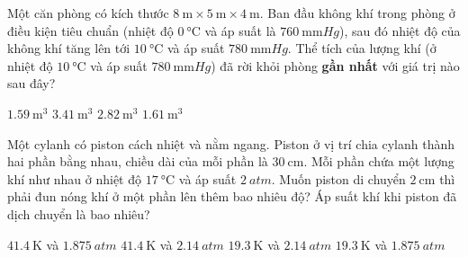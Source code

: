 \begin{ex}
Một căn phòng có kích thước $\SI{8}{\meter}\times \SI{5}{\meter}\times\SI{4}{\meter}$. Ban đầu không khí trong phòng ở điều kiện tiêu chuẩn (nhiệt độ $\SI{0}{\celsius}$ và áp suất là $\SI{760}{\milli\meter Hg}$), sau đó nhiệt độ của không khí tăng lên tới $\SI{10}{\celsius}$ và áp suất $\SI{780}{\milli\meter Hg}$. Thể tích của lượng khí (ở nhiệt độ $\SI{10}{\celsius}$ và áp suất $\SI{780}{\milli\meter Hg}$) đã rời khỏi phòng \textbf{gần nhất} với giá trị nào sau đây?
	
	\choice
	{$\SI{1.59}{\meter^3}$}
	{$\SI{3.41}{\meter^3}$}
	{$\SI{2.82}{\meter^3}$}
	{\True $\SI{1.61}{\meter^3}$}
\end{ex}
\begin{ex}
Một cylanh có piston cách nhiệt và nằm ngang. Piston ở vị trí chia cylanh thành hai phần bằng nhau, chiều dài của mỗi phần là $\SI{30}{\centi\meter}$. Mỗi phần chứa một lượng khí như nhau ở nhiệt độ $\SI{17}{\celsius}$ và áp suất $\SI{2}{atm}$. Muốn piston di chuyển $\SI{2}{\centi\meter}$ thì phải đun nóng khí ở một phần lên thêm bao nhiêu độ? Áp suất khí khi piston đã dịch chuyển là bao nhiêu?
	
	\choice
	{$\SI{41.4}{\kelvin}$ và $\SI{1.875}{atm}$}
	{\True $\SI{41.4}{\kelvin}$ và $\SI{2.14}{atm}$}
	{$\SI{19.3}{\kelvin}$ và $\SI{2.14}{atm}$}
	{$\SI{19.3}{\kelvin}$ và $\SI{1.875}{atm}$}
\end{ex}
